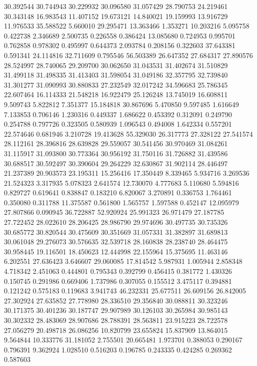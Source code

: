 30.392544
30.744943
30.229932
30.096580
31.057429
28.790753
24.219461
30.343148
16.983543
11.407152
19.673121
14.840021
19.159993
13.916729
11.976533
35.588522
5.660010
29.295471
13.363466
1.353271
10.203216
5.095758
0.422738
2.346689
2.500735
0.226558
0.386424
13.085680
0.724953
0.995701
0.762858
0.978302
0.495997
0.644373
2.093784
0.208156
0.322603
37.643381
0.591341
24.114816
32.711609
0.795546
56.503389
26.647352
27.684317
27.890576
28.524997
28.740065
29.209700
30.062650
31.043531
31.402674
31.510829
31.499118
31.498335
31.413403
31.598054
31.049186
32.357795
32.739840
31.301277
31.090993
30.880833
27.232549
32.017242
34.596683
25.786345
22.607464
16.114333
21.548218
16.922479
25.126248
13.745019
16.608811
9.509743
5.822812
7.351377
15.184818
30.867696
5.470850
9.597485
1.616649
7.133853
0.706146
1.230316
0.449337
1.686622
0.453392
0.312091
0.249790
0.254788
0.797726
0.323505
0.580939
1.096543
0.494008
1.642334
0.557201
22.574646
0.681946
3.210728
19.413628
55.329030
26.317773
27.328122
27.541574
28.112161
28.396816
28.639828
29.559057
30.541456
30.970469
31.084261
31.115917
31.093800
30.773364
30.956192
31.750116
31.726882
31.439586
30.688517
30.592497
30.390604
29.264229
32.630867
31.902114
28.446497
21.237389
20.903573
23.195311
15.256416
17.350449
8.339465
5.934716
3.269536
21.524323
3.317935
5.078323
2.641574
12.730070
4.777683
5.110680
5.594816
0.829727
0.619641
0.838847
0.183210
6.820067
3.270891
0.336753
1.764461
0.350080
0.311788
11.375587
0.561800
1.565757
1.597588
0.452147
12.095979
27.807866
0.090945
36.722887
52.920924
25.991323
26.971479
27.187785
27.722452
28.022610
28.206425
28.986790
29.974696
30.497735
30.735326
30.685772
30.820544
30.475609
30.351669
31.057331
31.382897
31.689813
30.061048
29.276073
30.576635
32.539718
28.160838
28.238740
28.464475
30.958445
19.116501
18.450623
12.444998
22.155964
15.375695
11.463146
6.202551
27.636423
3.646607
29.060085
17.814542
5.987931
1.005944
2.858348
4.718342
2.451063
0.444801
0.795343
0.392799
0.456415
0.381772
1.430326
0.150745
0.291986
0.669406
1.737986
0.307055
0.155512
3.475117
0.394881
0.121242
0.575183
0.119683
3.941743
46.232331
25.677511
26.609156
26.842005
27.302924
27.635852
27.778980
28.336510
29.356840
30.088811
30.323246
30.171375
30.401236
30.187747
29.907989
30.126103
30.265984
30.985143
30.302332
28.483069
28.907686
28.788391
28.563811
23.915223
28.722578
27.056279
20.498718
26.086256
10.820799
23.655824
15.837909
13.864015
9.564844
10.333776
31.181052
2.755501
20.665481
1.973701
0.388053
0.290167
0.796391
9.362924
1.028510
0.516203
0.196785
0.243335
0.424285
0.269362
0.587603

